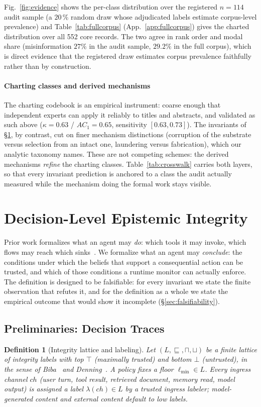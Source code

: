 \documentclass[conference]{IEEEtran}
\newtheorem{definition}{Definition}
\newcommand{\lmin}{\ensuremath{\ell_{\min}}}
\begin{document}
Fig.~\ref{fig:evidence} shows the per-class distribution over the
registered $n{=}114$ audit sample (a $20\,\%$ random draw whose
adjudicated labels estimate corpus-level prevalence) and
Table~\ref{tab:fullcorpus} (App.~\ref{app:fullcorpus}) gives the charted distribution over all
552 core records. The two agree in rank order and modal share
(misinformation $27\%$ in the audit sample, $29.2\%$ in the full
corpus), which is direct evidence that the registered draw
estimates corpus prevalence faithfully rather than by construction.





\paragraph*{Charting classes and derived mechanisms}
The charting codebook is an empirical instrument: coarse enough
that independent experts can apply it reliably to titles and
abstracts, and validated as such above ($\kappa = 0.63$ /
$AC_1 = 0.65$, sensitivity $[0.63, 0.73]$). The invariants of \S\ref{sec:definition}, by
contrast, cut on finer mechanism distinctions (corruption of the
substrate versus selection from an intact one, laundering versus
fabrication), which our analytic taxonomy names. These are not
competing schemes: the derived mechanisms \emph{refine} the
charting classes. Table~\ref{tab:crosswalk} carries both layers,
so that every invariant prediction is anchored to a class the
audit actually measured while the mechanism doing the formal work
stays visible.

\section{Decision-Level Epistemic Integrity}
\label{sec:definition}
Prior work formalizes what an agent may \emph{do}: which tools it
may invoke, which flows may reach which
sinks~\cite{camel,cxi,argus}. We formalize what an agent may
\emph{conclude}: the conditions under which the beliefs that
support a consequential action can be trusted, and which of those
conditions a runtime monitor can actually
enforce. The definition is designed to be falsifiable: for every
invariant we state the finite observation that refutes it, and for
the definition as a whole we state the empirical outcome that
would show it incomplete (\S\ref{sec:falsifiability}).

\subsection{Preliminaries: Decision Traces}
\begin{definition}[Integrity lattice and labeling]
Let $(L, \sqsubseteq, \sqcap, \sqcup)$ be a finite lattice of
integrity labels with top $\top$ (maximally trusted) and bottom
$\bot$ (untrusted), in the sense of Biba~\cite{biba} and
Denning~\cite{denning}. A policy fixes a floor $\lmin \in L$.
Every ingress channel $ch$ (user turn, tool result, retrieved
document, memory read, model output) is assigned a label
$\lambda(ch) \in L$ by a trusted ingress labeler; model-generated
content and external content default to low labels.
\end{definition}
\end{document}
